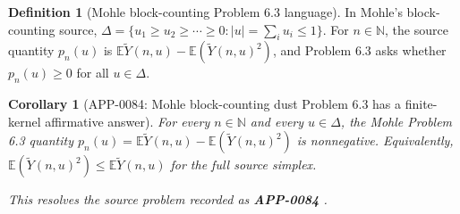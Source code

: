 \documentclass[11pt]{article}
\numberwithin{equation}{section}
\newtheorem{corollary}[theorem]{Corollary}
\theoremstyle{definition}
\newtheorem{definition}{Definition}[section]
\theoremstyle{remark}
\newcommand{\1}{\mathbf 1}
\begin{document}
\begin{definition}[Mohle block-counting Problem 6.3 language]
\label{res:mohle-blockcounting-problem63-language}
In Mohle's block-counting source, \(\Delta=\{u_1\ge u_2\ge\cdots\ge0: |u|=\sum_i u_i\le1\}\). For \(n\in\mathbb N\), the source quantity \(p_n(u)\) is \(\mathbb E\widetilde Y(n,u)-\mathbb E(\widetilde Y(n,u)^2)\), and Problem 6.3 asks whether \(p_n(u)\ge0\) for all \(u\in\Delta\).
\end{definition}

\begin{corollary}[APP-0084: Mohle block-counting dust Problem 6.3 has a finite-kernel affirmative answer]
\label{res:mohle-problem63-finitekernel-positive}
For every \(n\in\mathbb N\) and every \(u\in\Delta\), the Mohle Problem 6.3 quantity \(p_n(u)=\mathbb E\widetilde Y(n,u)-\mathbb E(\widetilde Y(n,u)^2)\) is nonnegative. Equivalently, \(\mathbb E(\widetilde Y(n,u)^2)\le\mathbb E\widetilde Y(n,u)\) for the full source simplex.



This resolves the source problem recorded as \textbf{APP-0084} \cite{app-app-0084-source}.
\end{corollary}
\end{document}
